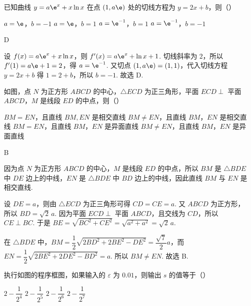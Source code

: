 \begin{problem}
已知曲线 \(y=a\e^x+x\ln x\) 在点 \((1,a\e)\) 处的切线方程为 \(y=2x+b\)，则（\quad）

\choices
    {\(a=\e\)，\(b=-1\)}
    {\(a=\e\)，\(b=1\)}
    {\(a=\e^{-1}\)，\(b=1\)}
    {\(a=\e^{-1}\)，\(b=-1\)}
\end{problem}

\begin{answer}
D
\end{answer}

\begin{solution}
设 \(f(x)=a\e^x+x\ln x\)，则 \(f'(x)=a\e^x+\ln x+1\). 切线斜率为 \(2\)，所以 \(f'(1)=a\e+1=2\)，得 \(a=\e^{-1}\). 又切点 \((1,a\e)=(1,1)\)，代入切线方程 \(y=2x+b\) 得 \(1=2+b\)，所以 \(b=-1\). 故选 D.
\end{solution}

\begin{problem}
如图，点 \(N\) 为正方形 \(ABCD\) 的中心，\(\triangle ECD\) 为正三角形，平面 \(ECD\perp\) 平面 \(ABCD\)，\(M\) 是线段 \(ED\) 的中点，则（\quad）


\choices
    {\(BM=EN\)，且直线 \(BM,EN\) 是相交直线}
    {\(BM\ne EN\)，且直线 \(BM\)，\(EN\) 是相交直线}
    {\(BM=EN\)，且直线 \(BM\)，\(EN\) 是异面直线}
    {\(BM\ne EN\)，且直线 \(BM\)，\(EN\) 是异面直线}
\end{problem}

\begin{answer}
B
\end{answer}

\begin{solution}
因为点 \(N\) 为正方形 \(ABCD\) 的中心，\(M\) 是线段 \(ED\) 的中点，所以 \(BM\) 是 \(\triangle BDE\) 中 \(DE\) 边上的中线，\(EN\) 是 \(\triangle BDE\) 中 \(BD\) 边上的中线，因此直线 \(BM\) 与 \(EN\) 是相交直线.

设 \(DE=a\)，则由 \(\triangle ECD\) 为正三角形可得 \(CD=CE=a\). 又 \(ABCD\) 为正方形，所以 \(BD=\sqrt2\,a\). 因为平面 \(ECD\perp\) 平面 \(ABCD\)，且交线为 \(CD\)，所以 \(CE\perp BC\). 于是 \(BE=\sqrt{BC^2+CE^2}=\sqrt{a^2+a^2}=\sqrt2\,a\).

在 \(\triangle BDE\) 中，\(BM=\dfrac12\sqrt{2BD^2+2BE^2-DE^2}=\dfrac{\sqrt7}{2}a\)，而 \(EN=\dfrac12\sqrt{2BE^2+2DE^2-BD^2}=a\). 所以 \(BM\ne EN\). 故选 B.
\end{solution}

\begin{problem}
执行如图的程序框图，如果输入的 \(\varepsilon\) 为 \(0.01\)，则输出 \(s\) 的值等于（\quad）

\begin{center}
\end{center}

\choices
    {\(2-\dfrac1{2^4}\)}
    {\(2-\dfrac1{2^5}\)}
    {\(2-\dfrac1{2^6}\)}
    {\(2-\dfrac1{2^7}\)}
\end{problem}

